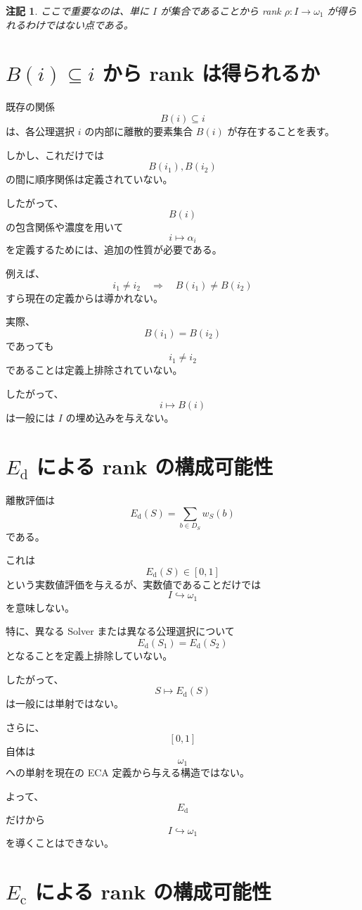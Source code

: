 \documentclass[a4paper,11pt]{article}
\newtheorem{remark}[definition]{注記}
\begin{document}
\begin{remark}
ここで重要なのは、単に $I$ が集合であることから rank
$\rho:I\to\omega_1$ が得られるわけではない点である。
\end{remark}

\section{$B(i)\subseteq i$ から rank は得られるか}

既存の関係
\[
B(i)\subseteq i
\]
は、各公理選択 $i$ の内部に離散的要素集合 $B(i)$ が存在することを表す。

しかし、これだけでは
\[
B(i_1),B(i_2)
\]
の間に順序関係は定義されていない。

したがって、
\[
B(i)
\]
の包含関係や濃度を用いて
\[
i\mapsto\alpha_i
\]
を定義するためには、追加の性質が必要である。

例えば、
\[
i_1\neq i_2
\quad\Longrightarrow\quad
B(i_1)\neq B(i_2)
\]
すら現在の定義からは導かれない。

実際、
\[
B(i_1)=B(i_2)
\]
であっても
\[
i_1\neq i_2
\]
であることは定義上排除されていない。

したがって、
\[
i\mapsto B(i)
\]
は一般には $I$ の埋め込みを与えない。

\section{$E_{\mathrm{d}}$ による rank の構成可能性}

離散評価は
\[
E_{\mathrm{d}}(S)
=
\sum_{b\in D_S}w_S(b)
\]
である。

これは
\[
E_{\mathrm{d}}(S)\in[0,1]
\]
という実数値評価を与えるが、実数値であることだけでは
\[
I\hookrightarrow\omega_1
\]
を意味しない。

特に、異なる Solver または異なる公理選択について
\[
E_{\mathrm{d}}(S_1)=E_{\mathrm{d}}(S_2)
\]
となることを定義上排除していない。

したがって、
\[
S\mapsto E_{\mathrm{d}}(S)
\]
は一般には単射ではない。

さらに、
\[
[0,1]
\]
自体は
\[
\omega_1
\]
への単射を現在の ECA 定義から与える構造ではない。

よって、
\[
E_{\mathrm{d}}
\]
だけから
\[
I\hookrightarrow\omega_1
\]
を導くことはできない。

\section{$E_{\mathrm{c}}$ による rank の構成可能性}
\end{document}
